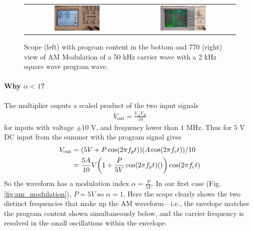 \documentclass[../main.tex]{subfiles}
\begin{document}
\begin{itemize}
\begin{itemize}
    \end{itemize}
    \begin{figure}[ht]
        \centering
        \begin{tabular}{cc}
            \includegraphics[width=0.45\textwidth]{fig2_8.png} & \includegraphics[width=0.45\textwidth]{fig2_9.png}
        \end{tabular}
        \captionsetup{width=0.8\textwidth}
        \caption{Scope (left) with program content in the bottom and 770 (right) view of AM Modulation of a 50 kHz carrier wave with a 2 kHz square wave program wave.}
        \label{fig:5}
    \end{figure}
\end{itemize}

\paragraph*{Why $\alpha < 1$?}
The multiplier ouputs a scaled product of the two input signals
\begin{align*}
    V_{\text{out}} = \frac{V_A V_B}{10}
\end{align*}
for inputs with voltage $\pm 10$ V, and frequency lower than $1$ MHz. Thus for $5$ V DC input from the summer with the program signal gives
\begin{align*}
    V_{\text{out}} &= (5 V + P \cos(2\pi f_p t)) (A \cos(2\pi f_c t)) / 10 \\
    &= \frac{5A}{10} V \qt(1 + \frac{P}{5 V} \cos(2\pi f_p t)\qt) \cos(2\pi f_c t)
\end{align*}
So the waveform has a modulation index $\alpha = \frac{P}{5 V}$. In our first case (Fig. \ref{fig:am_modulation}), $P = 5 V$ so $\alpha = 1$,
Here the scope clearly shows the two distinct frequencies that make up the AM waveform---i.e., the envelope matches the program content shown simultaneously below,
and the carrier frequency is resolved in the small oscillations within the envelope.
\end{document}
